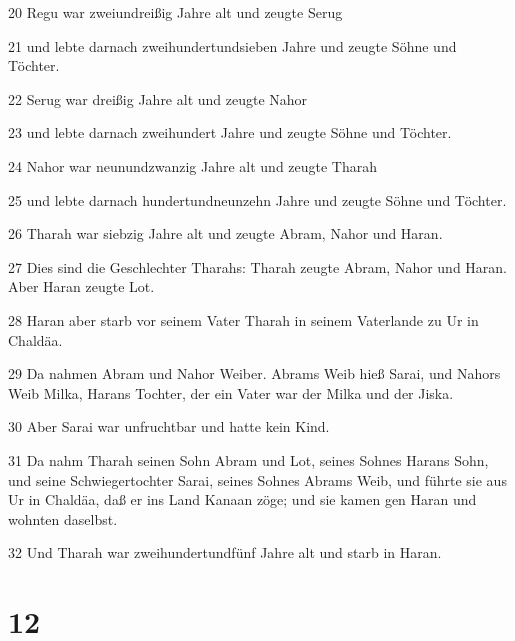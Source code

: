 \par 20 Regu war zweiundreißig Jahre alt und zeugte Serug
\par 21 und lebte darnach zweihundertundsieben Jahre und zeugte Söhne und Töchter.
\par 22 Serug war dreißig Jahre alt und zeugte Nahor
\par 23 und lebte darnach zweihundert Jahre und zeugte Söhne und Töchter.
\par 24 Nahor war neunundzwanzig Jahre alt und zeugte Tharah
\par 25 und lebte darnach hundertundneunzehn Jahre und zeugte Söhne und Töchter.
\par 26 Tharah war siebzig Jahre alt und zeugte Abram, Nahor und Haran.
\par 27 Dies sind die Geschlechter Tharahs: Tharah zeugte Abram, Nahor und Haran. Aber Haran zeugte Lot.
\par 28 Haran aber starb vor seinem Vater Tharah in seinem Vaterlande zu Ur in Chaldäa.
\par 29 Da nahmen Abram und Nahor Weiber. Abrams Weib hieß Sarai, und Nahors Weib Milka, Harans Tochter, der ein Vater war der Milka und der Jiska.
\par 30 Aber Sarai war unfruchtbar und hatte kein Kind.
\par 31 Da nahm Tharah seinen Sohn Abram und Lot, seines Sohnes Harans Sohn, und seine Schwiegertochter Sarai, seines Sohnes Abrams Weib, und führte sie aus Ur in Chaldäa, daß er ins Land Kanaan zöge; und sie kamen gen Haran und wohnten daselbst.
\par 32 Und Tharah war zweihundertundfünf Jahre alt und starb in Haran.

\chapter{12}

